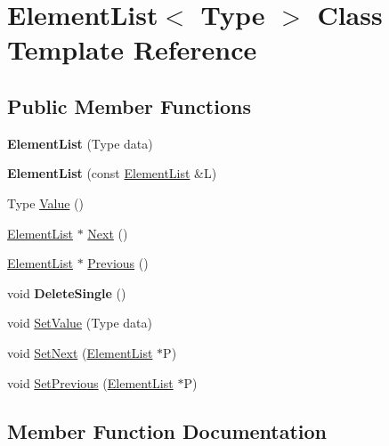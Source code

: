 \hypertarget{class_element_list}{}\section{Element\+List$<$ Type $>$ Class Template Reference}
\label{class_element_list}
\subsection*{Public Member Functions}
\begin{DoxyCompactItemize}
\item 
{\bfseries Element\+List} (Type data)\hypertarget{class_element_list_a657d74f5aeb35a37e262e4a2cb7b192a}{}\label{class_element_list_a657d74f5aeb35a37e262e4a2cb7b192a}

\item 
{\bfseries Element\+List} (const \hyperlink{class_element_list}{Element\+List} \&L)\hypertarget{class_element_list_a49ce6d6ce708ead740dcfbaa26513603}{}\label{class_element_list_a49ce6d6ce708ead740dcfbaa26513603}

\item 
Type \hyperlink{class_element_list_a0f874b08fce53174aa75eedf45682d64}{Value} ()
\item 
\hyperlink{class_element_list}{Element\+List} $\ast$ \hyperlink{class_element_list_a2644dc854591779ec7220fd56e0a16ba}{Next} ()
\item 
\hyperlink{class_element_list}{Element\+List} $\ast$ \hyperlink{class_element_list_a5144ccc57d38ce60ec3d5d82471579f6}{Previous} ()
\item 
void {\bfseries Delete\+Single} ()\hypertarget{class_element_list_a55fedd16d90c0b856117e02e837e311e}{}\label{class_element_list_a55fedd16d90c0b856117e02e837e311e}

\item 
void \hyperlink{class_element_list_af97aecca1b4863e795cf675f29ca7d13}{Set\+Value} (Type data)
\item 
void \hyperlink{class_element_list_af4c19f75c4c93b69f2023420ba477f7d}{Set\+Next} (\hyperlink{class_element_list}{Element\+List} $\ast$P)
\item 
void \hyperlink{class_element_list_a60590a74e879b84d87dc3f32bd9ad801}{Set\+Previous} (\hyperlink{class_element_list}{Element\+List} $\ast$P)
\end{DoxyCompactItemize}


\subsection{Member Function Documentation}
